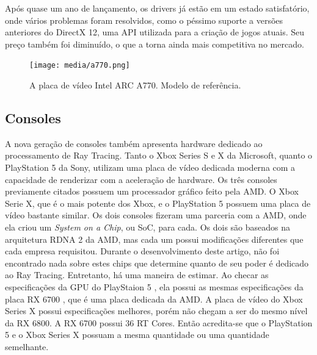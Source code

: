 \documentclass[journal]{IEEEtran}
\begin{document}
Após quase um ano de lançamento, os drivers já estão em um estado satisfatório, onde vários
problemas foram resolvidos, como o péssimo suporte a versões anteriores do DirectX 12, uma
API utilizada para a criação de jogos atuais. Seu preço também foi diminuído, o que a torna
ainda mais competitiva no mercado.

\begin{figure}[ht]
  \centering
  \texttt{[image: media/a770.png]}
  \caption{A placa de vídeo Intel ARC A770. Modelo de referência.}
  \label{img_a440}
\end{figure}


\subsection{Consoles}
A nova geração de consoles também apresenta hardware dedicado ao processamento de Ray Tracing.
Tanto o Xbox Series S e X da Microsoft, quanto o PlayStation 5 da Sony, utilizam uma placa de
vídeo dedicada moderna com a capacidade de renderizar com a aceleração de hardware. Os três 
consoles previamente citados possuem um processador gráfico feito pela AMD. O Xbox Serie X,
que é o mais potente dos Xbox, e o PlayStation 5 possuem uma placa de vídeo bastante similar.
Os dois consoles fizeram uma parceria com a AMD, onde ela criou um \emph{System on a Chip},
ou SoC, para cada. Os dois são baseados na arquitetura RDNA 2 da AMD, mas cada um possui
modificações diferentes que cada empresa requisitou. Durante o desenvolvimento deste artigo,
não foi encontrado nada sobre estes chips que determine quanto de seu poder é dedicado
ao Ray Tracing. Entretanto, há uma maneira de estimar. Ao checar as especificações da GPU
do PlayStaion 5 \cite{PS5Specs}, ela possui as mesmas especificações da placa RX 6700 
\cite{RX6700Specs}, que é uma placa dedicada da AMD. A placa de vídeo do Xbox Series X 
possui especificações melhores, porém não chegam a ser do mesmo nível da RX 6800. A RX 6700 
possui 36 RT Cores. Então acredita-se que o PlayStation 5 e o Xbox Series X possuam a mesma 
quantidade ou uma quantidade semelhante.
\end{document}
